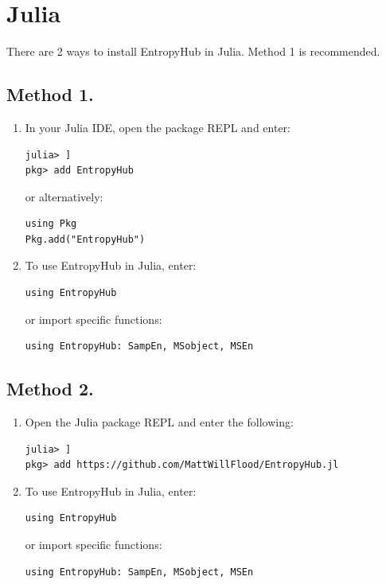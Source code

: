 \documentclass[12pt, a4paper, titlepage, openany]{book}
\begin{document}
\newpage
\section{\textbf{Julia}}
\noindent There are 2 ways to install EntropyHub in Julia. Method 1 is recommended.
\subsection*{\normalsize Method 1.}
\begin{enumerate}
\item  In your Julia IDE, open the package REPL and enter:
\begin{verbatim}
julia> ]
pkg> add EntropyHub
\end{verbatim}
or alternatively:
\begin{verbatim}
using Pkg
Pkg.add("EntropyHub")
\end{verbatim}
\item To use EntropyHub in Julia, enter:
\begin{verbatim}
using EntropyHub
\end{verbatim}
or import specific functions:
\begin{verbatim}
using EntropyHub: SampEn, MSobject, MSEn
\end{verbatim}
\end{enumerate}

\subsection*{\normalsize Method 2.}
\begin{enumerate}
\item  Open the Julia package REPL and enter the following:
\begin{verbatim}
julia> ]
pkg> add https://github.com/MattWillFlood/EntropyHub.jl
\end{verbatim}
\item To use EntropyHub in Julia, enter:
\begin{verbatim}
using EntropyHub
\end{verbatim}
or import specific functions:
\begin{verbatim}
using EntropyHub: SampEn, MSobject, MSEn
\end{verbatim}
\end{enumerate}
\end{document}
